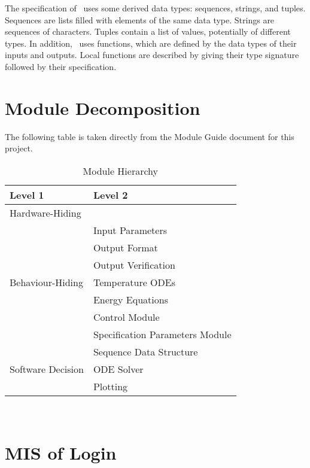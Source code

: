 \documentclass[12pt, titlepage]{article}
\begin{document}
\noindent
The specification of \progname \ uses some derived data types: sequences, strings, and
tuples. Sequences are lists filled with elements of the same data type. Strings
are sequences of characters. Tuples contain a list of values, potentially of
different types. In addition, \progname \ uses functions, which
are defined by the data types of their inputs and outputs. Local functions are
described by giving their type signature followed by their specification.

\section{Module Decomposition}

The following table is taken directly from the Module Guide document for this project.

\begin{table}[h!]
	\centering
	\begin{tabular}{p{} p{}}
		\toprule
		\textbf{Level 1} & \textbf{Level 2}\\
		\midrule
		
		{Hardware-Hiding} & ~ \\
		\midrule
		
		\multirow{7}{0.3\textwidth}{Behaviour-Hiding} & Input Parameters\\
		& Output Format\\
		& Output Verification\\
		& Temperature ODEs\\
		& Energy Equations\\ 
		& Control Module\\
		& Specification Parameters Module\\
		\midrule
		
		\multirow{3}{0.3\textwidth}{Software Decision} & {Sequence Data Structure}\\
		& ODE Solver\\
		& Plotting\\
		\bottomrule
		
	\end{tabular}
	\caption{Module Hierarchy}
	\label{TblMH}
\end{table}

\newpage
~\newpage

\section{MIS of Login} \label{Module} 
\end{document}
